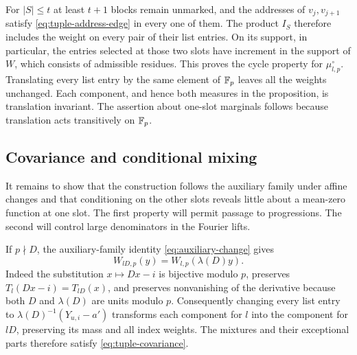 For $|S|\le t$ at least $t+1$ blocks remain unmarked, and the addresses
of $v_j,v_{j+1}$ satisfy \eqref{eq:tuple-address-edge} in every one of
them.  The product $I_S$ therefore includes the weight on every pair of
their list entries.  On its support, in particular, the entries selected
at those two slots have increment in the support of $W$, which consists
of admissible residues.  This proves the cycle property for
$\mu_{l,p}^{\circ}$.  Translating every list entry by the same element
of $\mathbb F_p$ leaves all the weights unchanged.  Each component,
and hence both measures in the proposition, is translation invariant.
The assertion about one-slot marginals follows because translation acts
transitively on $\mathbb F_p$.

\subsection{Covariance and conditional mixing}

It remains to show that the construction follows the auxiliary family
under affine changes and that conditioning on the other slots reveals
little about a mean-zero function at one slot.  The first property will
permit passage to progressions.  The second will control large
denominators in the Fourier lifts.

If $p\nmid D$, the auxiliary-family identity \eqref{eq:auxiliary-change} gives
\[
 W_{lD,p}(y)=W_{l,p}(\lambda(D)y).
\]
Indeed the substitution $x\mapsto Dx-i$ is bijective modulo $p$,
preserves $T_l(Dx-i)=T_{lD}(x)$, and preserves nonvanishing of the
derivative because both $D$ and $\lambda(D)$ are units modulo $p$.
Consequently changing every list entry to
$\lambda(D)^{-1}(Y_{u,i}-a')$ transforms each component for $l$ into
the component for $lD$, preserving its mass and all index weights.
The mixtures and their exceptional parts therefore satisfy
\eqref{eq:tuple-covariance}.

